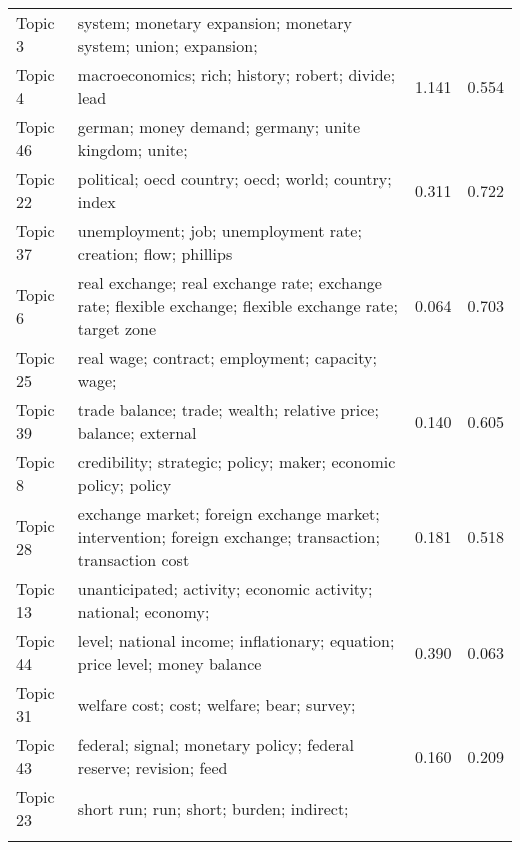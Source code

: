 \documentclass[
  12pt,
  onecolumn]{article}
\begin{document}
\begin{longtable}[t]{l>{\raggedright\arraybackslash}m{25em}cc}
\endfoot
\bottomrule
\endlastfoot
Topic 3 & system;
monetary
expansion;
monetary
system;
union;
expansion;
\cellcolor{gray!6}{stability} & \cellcolor{gray!6}{0.907} & \cellcolor{gray!6}{1.129}\\
Topic 4 & macroeconomics;
rich;
history;
robert;
divide;
lead & 1.141 & 0.554\\
Topic 46 & german;
money
demand;
germany;
unite
kingdom;
unite;
\cellcolor{gray!6}{kingdom} & \cellcolor{gray!6}{0.624} & \cellcolor{gray!6}{0.620}\\
Topic 22 & political;
oecd
country;
oecd;
world;
country;
index & 0.311 & 0.722\\
Topic 37 & unemployment;
job;
unemployment
rate;
creation;
flow;
phillips
\cellcolor{gray!6}{curve} & \cellcolor{gray!6}{0.466} & \cellcolor{gray!6}{0.528}\\
\addlinespace
Topic 6 & real
exchange;
real
exchange
rate;
exchange
rate;
flexible
exchange;
flexible
exchange
rate;
target
zone & 0.064 & 0.703\\
Topic 25 & real
wage;
contract;
employment;
capacity;
wage;
\cellcolor{gray!6}{stickiness} & \cellcolor{gray!6}{0.208} & \cellcolor{gray!6}{0.548}\\
Topic 39 & trade
balance;
trade;
wealth;
relative
price;
balance;
external & 0.140 & 0.605\\
Topic 8 & credibility;
strategic;
policy;
maker;
economic
policy;
policy
\cellcolor{gray!6}{rule} & \cellcolor{gray!6}{0.468} & \cellcolor{gray!6}{0.240}\\
Topic 28 & exchange
market;
foreign
exchange
market;
intervention;
foreign
exchange;
transaction;
transaction
cost & 0.181 & 0.518\\
\addlinespace
Topic 13 & unanticipated;
activity;
economic
activity;
national;
economy;
\cellcolor{gray!6}{gap} & \cellcolor{gray!6}{0.196} & \cellcolor{gray!6}{0.418}\\
Topic 44 & level;
national
income;
inflationary;
equation;
price
level;
money
balance & 0.390 & 0.063\\
Topic 31 & welfare
cost;
cost;
welfare;
bear;
survey;
\cellcolor{gray!6}{household} & \cellcolor{gray!6}{0.467} & \cellcolor{gray!6}{-0.093}\\
Topic 43 & federal;
signal;
monetary
policy;
federal
reserve;
revision;
feed & 0.160 & 0.209\\
Topic 23 & short
run;
run;
short;
burden;
indirect;
\cellcolor{gray!6}{externality} & \cellcolor{gray!6}{0.042} & \cellcolor{gray!6}{0.307}\\
\addlinespace

\end{longtable}
\end{document}
